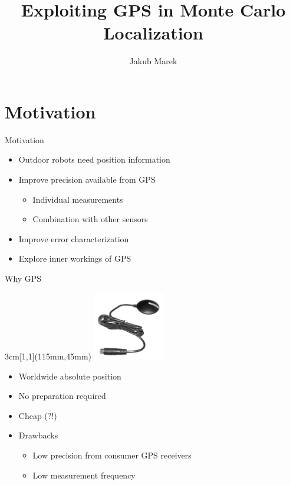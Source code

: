 \documentclass[utf8,12pt]{beamer}
\title{Exploiting GPS in Monte Carlo Localization}
\author{Jakub Marek}
\begin{document}
\begin{frame}[plain]
\titlepage
\end{frame}

\section{Motivation}
\begin{frame}{Motivation}
\begin{itemize}
    \item Outdoor robots need position information
    \item Improve precision available from GPS
    \begin{itemize}
        \item Individual measurements
        \item Combination with other sensors
    \end{itemize}
    \item Improve error characterization
    \item Explore inner workings of GPS
\end{itemize}
\end{frame}


\begin{frame}{Why GPS}
\begin{textblock*}{3cm}[1,1](115mm,45mm)
    \includegraphics[height=3cm]{img/receiver.jpg}
\end{textblock*}
\begin{itemize}
    \item Worldwide absolute position
    \item No preparation required
    \item Cheap (?!)
    \item Drawbacks
    \begin{itemize}
        \item Low precision from consumer GPS receivers
        \item Low measurement frequency
    \end{itemize}
\end{itemize}
\end{frame}
\end{document}
